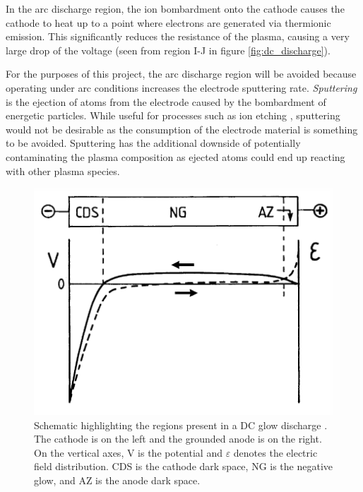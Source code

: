 In the arc discharge region, the ion bombardment onto the cathode causes the cathode to heat up to a point where electrons are generated via thermionic emission. This significantly reduces the resistance of the plasma, causing a very large drop of the voltage (seen from region I-J in figure \ref{fig:dc_discharge}). 

For the purposes of this project, the arc discharge region will be avoided because operating under arc conditions increases the electrode sputtering rate. \textit{Sputtering} is the ejection of atoms from the electrode caused by the bombardment of energetic particles. While useful for processes such as ion etching \cite{Lieberman2005}, sputtering would not be desirable as the consumption of the electrode material is something to be avoided. Sputtering has the additional downside of potentially contaminating the plasma composition as ejected atoms could end up reacting with other plasma species. 

\begin{figure}[h!]
	\centering
	\includegraphics[width=0.7\linewidth]{chapter_2/figures/glow_discharge.png}
	\caption{Schematic highlighting the regions present in a DC glow discharge \cite{Bogaerts2002}. The cathode is on the left and the grounded anode is on the right. On the vertical axes, V is the potential and $\varepsilon$ denotes the electric field distribution. CDS is the cathode dark space, NG is the negative glow, and AZ is the anode dark space.}
	\label{fig:glow_discharge}
\end{figure}

